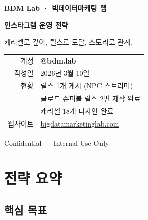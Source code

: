 \documentclass[11pt, a4paper]{article}
\begin{document}

\begin{titlepage}
\centering
\vspace*{4cm}

{\fontsize{14}{16}\selectfont\textcolor{accent}{\textbf{BDM Lab · 빅데이터마케팅 랩}}}

\vspace{1cm}

{\fontsize{28}{34}\selectfont\textbf{인스타그램 운영 전략}}

\vspace{0.5cm}

{\fontsize{14}{18}\selectfont\textcolor{muted}{캐러셀로 깊이, 릴스로 도달, 스토리로 관계.}}

\vspace{3cm}

\begin{tabular}{rl}
\textcolor{muted}{계정} & \textbf{@bdm.lab} \\[4pt]
\textcolor{muted}{작성일} & 2026년 3월 10일 \\[4pt]
\textcolor{muted}{현황} & 릴스 1개 게시 (NPC 스트리머) \\
 & 클로드 슈퍼볼 릴스 2편 제작 완료 \\
 & 캐러셀 18개 디자인 완료 \\[4pt]
\textcolor{muted}{웹사이트} & \href{https://bigdatamarketinglab.com}{bigdatamarketinglab.com}
\end{tabular}

\vfill
{\small\textcolor{muted}{Confidential — Internal Use Only}}
\end{titlepage}


\tableofcontents
\newpage


\section{전략 요약}

\subsection{핵심 목표}
\end{document}
